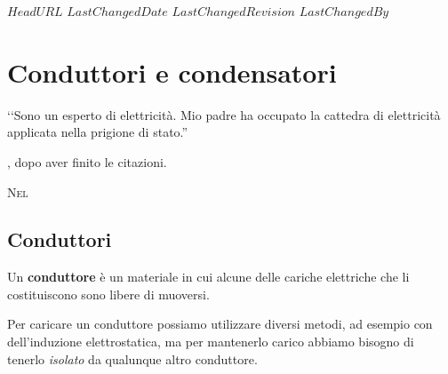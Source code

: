 \svnidlong
{$HeadURL$}
{$LastChangedDate$}
{$LastChangedRevision$}
{$LastChangedBy$}

\chapter{Conduttori e condensatori}

\begin{introduction}
	‘‘Sono un esperto di elettricità. Mio padre ha occupato la cattedra di elettricità applicata nella	prigione di stato.''
	\begin{flushright}
		, dopo aver finito le citazioni. %
	\end{flushright}
\end{introduction}
\lettrine[findent=1pt, nindent=0pt]{N}{el} %

\section{Conduttori}
\begin{define}[Conduttore]
	Un \textbf{conduttore} è un materiale in cui alcune delle cariche elettriche che li costituiscono sono libere di muoversi.
\end{define}
Per caricare un conduttore possiamo utilizzare diversi metodi, ad esempio con dell'induzione elettrostatica, ma per mantenerlo carico abbiamo bisogno di tenerlo \textit{isolato} da qualunque altro conduttore.

